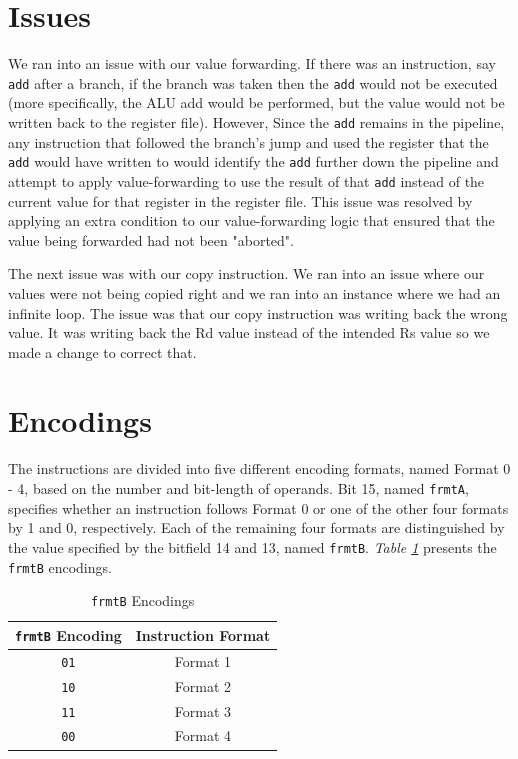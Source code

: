 \documentclass[sigconf, nonacm=true, screen=true]{acmart}
\begin{document}
\section{Issues}

We ran into an issue with our value forwarding. If there was an instruction, say \texttt{add} after a branch, if the branch was taken then the \texttt{add} would not be executed (more specifically, the ALU add would be performed, but the value would not be written back to the register file). However, Since the \texttt{add} remains in the pipeline, any instruction that followed the branch's jump and used the register that the \texttt{add} would have written to would identify the \texttt{add} further down the pipeline and attempt to apply value-forwarding to use the result of that \texttt{add} instead of the current value for that register in the register file. This issue was resolved by applying an extra condition to our value-forwarding logic that ensured that the value being forwarded had not been "aborted". 

The next issue was with our copy instruction. We ran into an issue where our values were not being copied right and we ran into an instance where we had an infinite loop. The issue was that our copy instruction was writing back the wrong value. It was writing back the Rd value instead of the intended Rs value so we made a change to correct that.


\clearpage
\appendix


\section{Encodings} 
\label{appendix:encodings}
The instructions are divided into five different encoding formats, named Format 0 - 4, based on the number and bit-length of operands. Bit 15, named \texttt{frmtA}, specifies whether an instruction follows Format 0 or one of the other four formats by 1 and 0, respectively. Each of the remaining four formats are distinguished by the value specified by the bitfield 14 and 13, named \texttt{frmtB}. \textit{Table \ref{table:frmtB-encodings}} presents the \texttt{frmtB} encodings.

\begin{center}
    \begin{table}[h]
        \begin{tabular}{cc}
            \toprule
            \texttt{frmtB} Encoding & Instruction Format \\
            \midrule
            \texttt{01} & Format 1 \\
            \texttt{10} & Format 2 \\
            \texttt{11} & Format 3 \\
            \texttt{00} & Format 4 \\
            \bottomrule
        \end{tabular}
        \caption{\texttt{frmtB} Encodings}
        \label{table:frmtB-encodings}
    \end{table}
\end{center}
\end{document}
